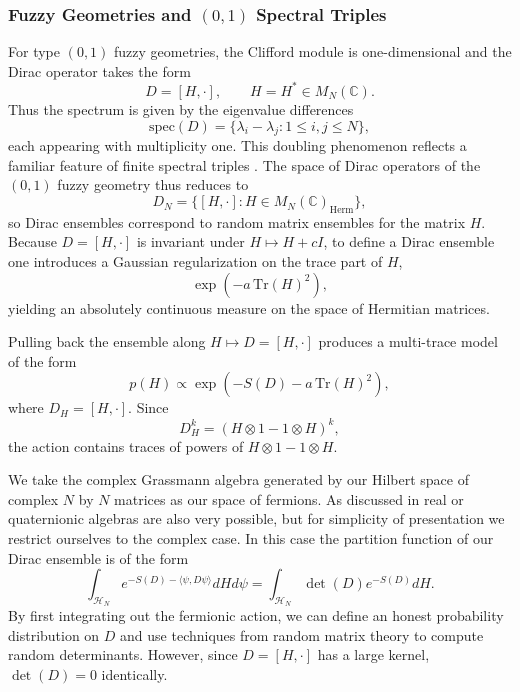\documentclass[11pt]{article}
\theoremstyle{plain}
\begin{document}
\subsubsection{Fuzzy Geometries and $(0,1)$ Spectral Triples}

For type $(0,1)$ fuzzy geometries, the Clifford module is one-dimensional and the Dirac 
operator takes the form
\[
D = [H,\cdot], \qquad H = H^\ast \in M_{N}(\mathbb{C}).
\]
Thus the spectrum is given by the eigenvalue differences
\begin{equation}
	\label{eq:spectrum-dfuzzy-plain}
	\mathrm{spec}(D)
	=
	\{\lambda_i - \lambda_j : 1\le i,j\le N\},
\end{equation}
each appearing with multiplicity one.  
This doubling phenomenon reflects a familiar feature of finite spectral 
triples \cite{Connes94, QFTNCG}. The space of Dirac operators of the $(0,1)$ fuzzy geometry thus reduces to
\[
D_{N} = \{[H,\cdot] : H \in M_{N}(\mathbb{C})_{\text{Herm}}\},
\]
so Dirac ensembles correspond to random matrix ensembles for the matrix $H$. Because $D=[H,\cdot]$ is invariant under $H\mapsto H+cI$, to define a Dirac ensemble one introduces a 
Gaussian regularization on the trace part of $H$,
\[
\exp(-a\, \mathrm{Tr}(H)^{2}),
\]
yielding an absolutely continuous measure on the space of Hermitian matrices.

Pulling back the ensemble along $H\mapsto D=[H,\cdot]$ produces a 
multi-trace model of the form
\[
p(H) \propto 
\exp\!\left(
-S(D) - a\, \mathrm{Tr}(H)^{2}
\right),
\]
where $D_{H} = [H,\cdot]$.  
Since
\[
D_{H}^{k}
=
(H\otimes 1 - 1\otimes H)^{k},
\]
the action contains traces of powers of $H\otimes 1 - 1\otimes H$.

We take the complex Grassmann algebra generated by our Hilbert space of complex $N$ by $N$ matrices as our space of fermions. As discussed in \cite{Barrett2024} real or quaternionic algebras are also very possible, but for simplicity of presentation we restrict ourselves to the complex case. In this case the partition function of our Dirac ensemble is of the form
\begin{equation*}
	\int_{\mathcal{H}_{N}}e^{-S(D) -\langle \psi, D \psi \rangle}dHd \psi = 	\int_{\mathcal{H}_{N}}\det(D)e^{-S(D)} dH.
\end{equation*}
By first integrating out the fermionic action, we can define an honest probability distribution on $D$ and use techniques from random matrix theory to compute random determinants. However, since $D=[H,\cdot]$ has a large kernel, $\det(D)=0$ identically.
\end{document}
